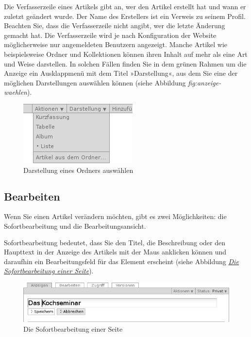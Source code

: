 \documentclass[a4paper,12pt,ngerman]{manual}
\begin{document}
Die Verfasserzeile eines Artikels gibt an, wer den Artikel erstellt hat und
wann er zuletzt geändert wurde. Der Name des Erstellers ist ein Verweis zu
seinem Profil. Beachten Sie, dass die Verfasserzeile nicht angibt, wer die
letzte Änderung gemacht hat. Die Verfasserzeile wird je nach Konfiguration der
Website möglicherweise nur angemeldeten Benutzern angezeigt.
\hypertarget{sec-anzeige-waehlen}{}
Manche Artikel wie beispielsweise Ordner und Kollektionen können ihren
Inhalt auf mehr als eine Art und Weise darstellen. In solchen Fällen finden
Sie in dem grünen Rahmen um die Anzeige ein Ausklappmenü mit dem
Titel »Darstellung«, aus dem Sie eine der möglichen Darstellungen auswählen
können (siehe Abbildung \emph{fig:anzeige-waehlen}).
\hypertarget{fig-anzeige-waehlen}{}\begin{figure}[htbp]
\centering

\includegraphics{anzeige-waehlen.png}
\caption{Darstellung eines Ordners auswählen}\end{figure}
\hypertarget{sec-bearbeiten}{}

\subsection{Bearbeiten}

Wenn Sie einen Artikel verändern möchten, gibt es zwei Möglichkeiten: die
Sofortbearbeitung und die Bearbeitungsansicht.

Sofortbearbeitung bedeutet, dass Sie den Titel, die Beschreibung oder den
Haupttext in der Anzeige des Artikels mit der Maus anklicken können und
daraufhin ein Bearbeitungsfeld für das Element erscheint (siehe
Abbildung \hyperlink{fig-sofortbearbeitung}{\emph{Die Sofortbearbeitung einer Seite}}).
\hypertarget{fig-sofortbearbeitung}{}\begin{figure}[htbp]
\centering

\includegraphics{titel-bearbeiten-ajax.png}
\caption{Die Sofortbearbeitung einer Seite}\end{figure}
\end{document}
